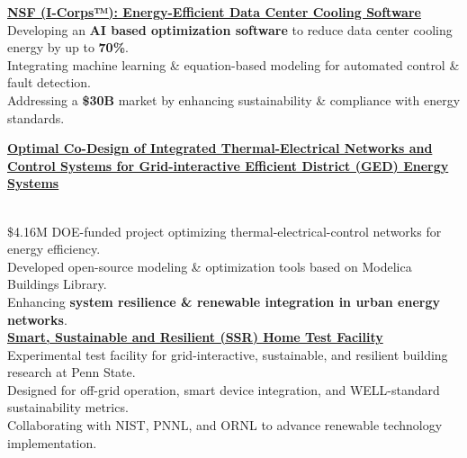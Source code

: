 \documentclass[]{Keval-resume}
\begin{document}
{{\href{https://sites.psu.edu/sbslab/i-corps-datacenter/}{\textbf{NSF (I-Corps™): Energy-Efficient Data Center Cooling Software}}\\
\hspace{1.5em} \textbullet{} Developing an \textbf{AI based optimization software} to reduce data center cooling energy by up to \textbf{70\%}.\\
\hspace{1.5em} \textbullet{} Integrating machine learning \& equation-based modeling for automated control \& fault detection.\\
\hspace{1.5em} \textbullet{} Addressing a \textbf{\$30B} market by enhancing sustainability \& compliance with energy standards.\\


\begin{minipage}[t]{.85\textwidth}
	 \href{https://sites.psu.edu/sbslab/research/city/grid-interactive-efficient-district-energy-system/}{\textbf{Optimal Co-Design of Integrated Thermal-Electrical Networks and Control Systems for Grid-interactive Efficient District (GED) Energy Systems} }
\end{minipage}%
\\
\hspace{1.5em} \textbullet{} 
\$4.16M DOE-funded project optimizing thermal-electrical-control networks for energy efficiency.\\
\hspace{1.5em} \textbullet{} Developed open-source modeling \& optimization tools based on Modelica Buildings Library.\\
\hspace{1.5em} \textbullet{} Enhancing \textbf{system resilience \& renewable integration in urban energy networks}.\\

\href{https://sites.psu.edu/sbslab/research/buildings/ssr/}{\textbf{Smart, Sustainable and Resilient (SSR) Home Test Facility}}\\
\hspace{1.5em} \textbullet{} Experimental test facility for grid-interactive, sustainable, and resilient building research at Penn State.\\
\hspace{1.5em} \textbullet{} Designed for off-grid operation, smart device integration, and WELL-standard sustainability metrics.\\
\hspace{1.5em} \textbullet{} Collaborating with NIST, PNNL, and ORNL to advance renewable technology implementation.\\

}}
\end{document}
